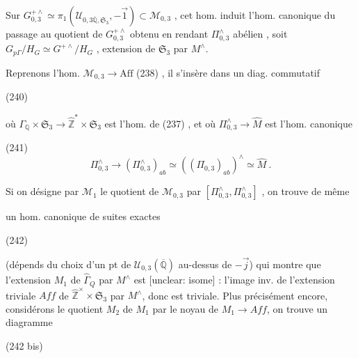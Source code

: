 Sur $G_{0,3}^{+ \wedge} \simeq \pi_1(\mathcal{U}_{0,3 \overline{\mathbb{Q}}, \mathfrak{S}_3}, -\vec{1}) \subset \mathcal{M}_{0,3}$ , cet hom. induit l'hom. canonique du passage au quotient de $G_{0,3}^{+ \wedge}$ obtenu en rendant $\Pi_{0,3}^\wedge$ abélien , soit $G_{p\Gamma}/H_G \simeq G^{+ \wedge}/H_G$ , extension de $\mathfrak{S}_3$ par $M^\wedge$.

Reprenons l'hom. $\mathcal{M}_{0,3} \to \text{Aff}$ (238) , il s'insère dans un diag. commutatif

(240)

où $\Gamma_{\mathbb{Q}} \times \mathfrak{S}_3 \to \hat{\mathbb{Z}}^* \times \mathfrak{S}_3$ est l'hom. de (237) , et
où $\Pi_{0,3}^\wedge \to \hat{M}$ est l'hom. canonique

(241) $$ \Pi_{0,3}^\wedge \to (\Pi_{0,3}^\wedge)_{ab} \simeq ((\Pi_{0,3})_{ab})^\wedge \simeq \hat{M} \ . $$

Si on désigne par $\mathcal{M}_1$ le quotient de $\mathcal{M}_{0,3}$ par $[\Pi_{0,3}^\wedge, \Pi_{0,3}^\wedge]$ , on trouve de même

\newpage


un hom. canonique de suites exactes

(242)

(dépends du choix d'un pt de $\mathcal{U}_{0,3}(\overline{\mathbb{Q}})$ au-dessus de $-\vec{j}$)
qui montre que l'extension $M_1$ de $\hat{\Gamma}_Q$ par $M^\wedge$
est [unclear: isome] : l'image inv. de l'extension
triviale $Aff$ de $\hat{\mathbb{Z}}^\times \times \mathfrak{S}_3$ par $M^\wedge$, donc est
triviale. Plus précisément encore, considérons
le quotient $M_2$ de $M_1$ par le noyau de $M_1 \to Aff$,
on trouve un diagramme

(242 bis)


